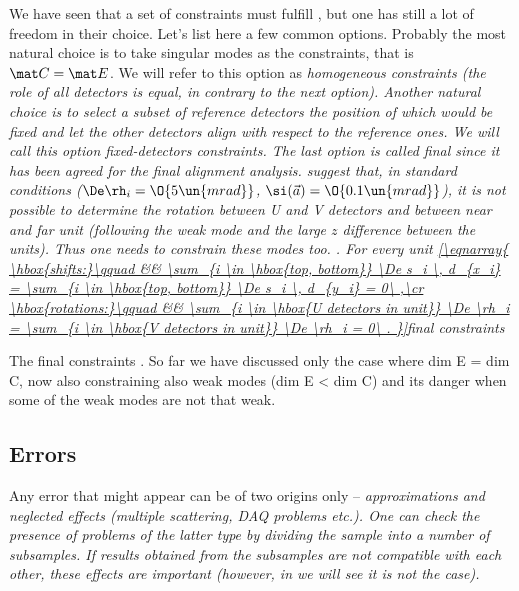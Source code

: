 We have seen that a set of constraints must fulfill , but one has still a lot of freedom in their choice. Let's list here a few common options.
\> Probably the most natural choice is to take singular modes as the constraints, that is $\mat C = \mat E$. We will refer to this option as \em{homogeneous} constraints (the role of all detectors is equal, in contrary to the next option). 
\> Another natural choice is to select a subset of reference detectors the position of which would be fixed and let the other detectors align with respect to the reference ones. We will call this option \em{fixed-detectors} constraints. 
\> The last option is called \em{final} since it has been agreed for the final alignment analysis.  suggest that, in standard conditions ($\De\rh_i = \O{5\un{mrad}}$, $\si(\vec a)=\O{0.1\un{mrad}}$), it is not possible to determine the rotation between U and V detectors and between near and far unit (following the weak mode  and the large $z$ difference between the units). Thus one needs to constrain these modes too. . For every unit
\eqref{\eqnarray{
\hbox{shifts:}\qquad && \sum_{i \in \hbox{top, bottom}} \De s_i \, d_{x_i} = \sum_{i \in \hbox{top, bottom}} \De s_i \, d_{y_i} = 0\ ,\cr
\hbox{rotations:}\qquad && \sum_{i \in \hbox{U detectors in unit}} \De \rh_i =
\sum_{i \in \hbox{V detectors in unit}} \De \rh_i = 0\ .
}}{final constraints}

The final constraints . So far we have discussed only the case where dim E = dim C, now also constraining also weak modes (dim E < dim C) and its danger when some of the weak modes are not that weak.


\subsection[al err]{Errors}


Any error that might appear can be of two origins only -- \em{approximations} and \em{neglected effects} (multiple scattering, DAQ problems etc.). One can check the presence of problems of the latter type by dividing the sample into a number of subsamples. If results obtained from the subsamples are not compatible with each other, these effects are important (however, in  we will see it is not the case). 

